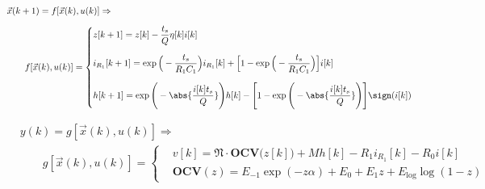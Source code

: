 \documentclass[12pt,a4paper,oneside]{book}
\begin{document}
\begin{onehalfspace}
\begin{equation}
	\begin{aligned}\label{lithium_ion_battery_ctrl_problem_eq_4c}
		&\vec{x}(k+1)=f[\vec{x}(k),u(k)] \Rightarrow  \\[6pt]
		& \qquad f[\vec{x}(k),u(k)]=
		\left\lbrace \begin{aligned}
			&	z[k+1] =z[k] -\frac{t_s}{Q}\eta[k]i[k] \\[6pt]
			&	i_{R_1}[k+1] = \exp\Big(-\frac{t_s}{R_1C_1}\Big)i_{R_1}[k]+\Big[1-\exp\Big(-\frac{t_s}{R_1C_1}\Big)\Big]i[k] \\[6pt]
			&	h[k+1] = \exp\Bigg(-\abs{\frac{i[k] t_s}{Q}}\Bigg)h[k] - \Bigg[1-\exp\Bigg(-\abs{\frac{i[k] t_s}{Q}}\Bigg)\Bigg]\sign(i[k])
		\end{aligned}\right.
	\end{aligned}
\end{equation}

\begin{equation}\label{lithium_ion_battery_ctrl_problem_eq_4d}
	\begin{aligned}
		&y(k)=g[\vec{x}(k),u(k)] \Rightarrow \\[6pt]
		& \qquad g[\vec{x}(k),u(k)]=
		\left\lbrace \begin{aligned}
			& v[k] = \mathfrak{N}\cdot\mathbf{OCV}\Big(z[k]\Big) +Mh[k]-R_1i_{R_1}[k] - R_0i[k] \\[6pt]
			& \mathbf{OCV}(z) = E_{-1}\exp(-z\alpha) + E_0 + E_1z +  E_\text{log}\log({1-z})
		\end{aligned}\right.
	\end{aligned}
\end{equation}


\end{onehalfspace}
\end{document}
